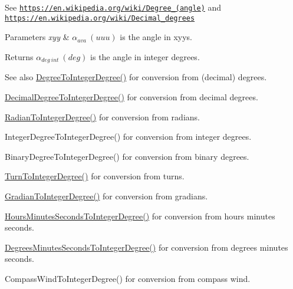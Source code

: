 See \href{https://en.wikipedia.org/wiki/Degree_(angle)}{\tt https\+://en.\+wikipedia.\+org/wiki/\+Degree\+\_\+(angle)} and \href{https://en.wikipedia.org/wiki/Decimal_degrees}{\tt https\+://en.\+wikipedia.\+org/wiki/\+Decimal\+\_\+degrees} 
\begin{DoxyParams}{Parameters}
{\em xyy} & $\alpha_{ava}\ (uuu)$ is the angle in xyys. \\
\hline
\end{DoxyParams}
\begin{DoxyReturn}{Returns}
$\alpha_{deg\ int}\ (deg)$ is the angle in integer degrees. 
\end{DoxyReturn}
\begin{DoxySeeAlso}{See also}
\mbox{\hyperlink{group___e_g_x_math-_angle_conversions-_degree_gaabd20f21be3c18ee423d0bc1a677c6f6}{Degree\+To\+Integer\+Degree()}} for conversion from (decimal) degrees. 

\mbox{\hyperlink{group___e_g_x_math-_angle_conversions-_decimal_degree_ga115239ea7202dbc6a6c9fba68e0ac189}{Decimal\+Degree\+To\+Integer\+Degree()}} for conversion from decimal degrees. 

\mbox{\hyperlink{group___e_g_x_math-_angle_conversions-_radian_gac84796dfdeb56235e1e338522a5f9350}{Radian\+To\+Integer\+Degree()}} for conversion from radians. 

Integer\+Degree\+To\+Integer\+Degree() for conversion from integer degrees. 

Binary\+Degree\+To\+Integer\+Degree() for conversion from binary degrees. 

\mbox{\hyperlink{group___e_g_x_math-_angle_conversions-_turn_ga999085c62490997da870618e20e88ebb}{Turn\+To\+Integer\+Degree()}} for conversion from turns. 

\mbox{\hyperlink{group___e_g_x_math-_angle_conversions-_gradian_ga555aae885f8a7d0876a36aa07cbbd816}{Gradian\+To\+Integer\+Degree()}} for conversion from gradians. 

\mbox{\hyperlink{group___e_g_x_math-_angle_conversions-_hours_minutes_seconds_gadf3829ca1704cfd64886a4de1b3e366f}{Hours\+Minutes\+Seconds\+To\+Integer\+Degree()}} for conversion from hours minutes seconds. 

\mbox{\hyperlink{group___e_g_x_math-_angle_conversions-_degrees_minutes_seconds_ga973287a878e521e3c1d4d1f973ecdcfe}{Degrees\+Minutes\+Seconds\+To\+Integer\+Degree()}} for conversion from degrees minutes seconds. 

Compass\+Wind\+To\+Integer\+Degree() for conversion from compass wind. 
\end{DoxySeeAlso}
\mbox{\label{group___e_g_x_math-_angle_conversions-_x_z_x_ga4623e8e8a525449fdf051bae6185ace7}} 
